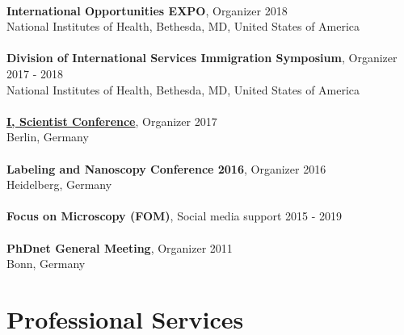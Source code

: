 \documentclass[margin,line]{res}
\begin{document}
\begin{resume}
\vspace*{-3mm}\\
{\bf International Opportunities EXPO}, Organizer \hfill {2018}\\
National Institutes of Health, Bethesda, MD, United States of America\\
\vspace*{-3mm}\\
{\bf Division of International Services Immigration Symposium}, Organizer  \hfill {2017 - 2018}\\
National Institutes of Health, Bethesda, MD, United States of America\\
\vspace*{-3mm}\\
{\bf \href{https://www.iscientist.berlin/}{I, Scientist Conference}},  Organizer \hfill {2017}\\
Berlin, Germany\\
\vspace*{-3mm}\\
{\bf Labeling and Nanoscopy Conference 2016}, Organizer \hfill {2016}\\
Heidelberg, Germany\\
\vspace*{-3mm}\\
{\bf Focus on Microscopy (FOM)}, Social media support \hfill {2015 - 2019}\\
\vspace*{-3mm}\\
{\bf PhDnet General Meeting}, Organizer \hfill {2011}\\
Bonn, Germany


\section{\sc Professional Services}


\end{resume}
\end{document}
